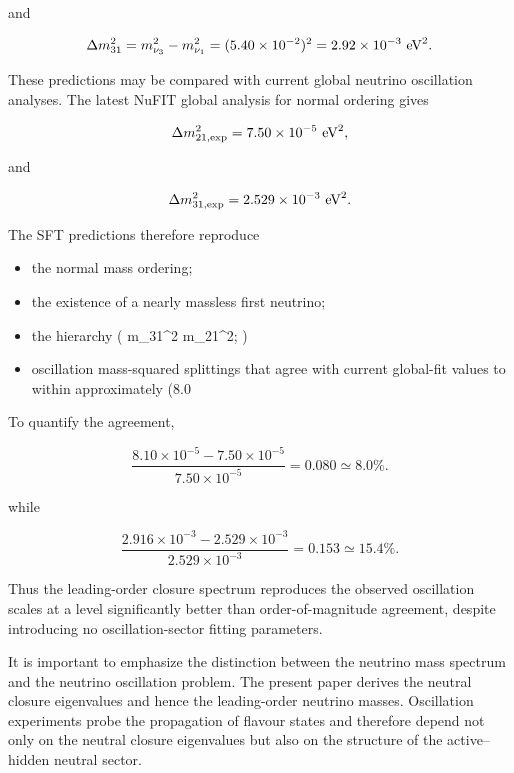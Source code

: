 \documentclass[11pt]{article}
\theoremstyle{definition}
\theoremstyle{remark}
\begin{document}
and 

\begin{equation} \Delta m_{31}^2 = m_{\nu_3}^2 - m_{\nu_1}^2 = (5.40\times10^{-2})^2 = 2.92\times10^{-3}\ {\rm eV}^2. \label{eq:sft_delta31} \end{equation} 

These predictions may be compared with current global neutrino oscillation analyses. The latest NuFIT global analysis for normal ordering gives \cite{NuFIT2024,NuFITWeb}

\begin{equation}
\Delta m_{21,\rm exp}^{2} = 
7.50\times10^{-5}
\ {\rm eV}^{2},
\end{equation}

and

\begin{equation}
\Delta m_{31,\rm exp}^{2} =
2.529\times10^{-3}
\ {\rm eV}^{2}.
\end{equation}

The SFT predictions therefore reproduce

\begin{itemize}
\item the normal mass ordering;
\item the existence of a nearly massless first neutrino;
\item the hierarchy
(
\Delta m_{31}^{2}
\gg
\Delta m_{21}^{2};
)
\item oscillation mass-squared splittings that agree with current global-fit values to within approximately (8.0%
\end{itemize}

To quantify the agreement,

\begin{equation}
\frac{
8.10\times10^{-5}
-
7.50\times10^{-5}
}{
7.50\times10^{-5}
}
=
0.080
\simeq
8.0\%.
\end{equation}

while

\begin{equation}
\frac{
2.916\times10^{-3}
-
2.529\times10^{-3}
}{
2.529\times10^{-3}
}
=
0.153
\simeq
15.4\%.
\end{equation}

Thus the leading-order closure spectrum reproduces the observed oscillation scales at a level significantly better than order-of-magnitude agreement, despite introducing no oscillation-sector fitting parameters.

It is important to emphasize the distinction between the neutrino mass spectrum and the neutrino oscillation problem. The present paper derives the neutral closure eigenvalues and hence the leading-order neutrino masses. Oscillation experiments probe the propagation of flavour states and therefore depend not only on the neutral closure eigenvalues but also on the structure of the active--hidden neutral sector.
\end{document}
